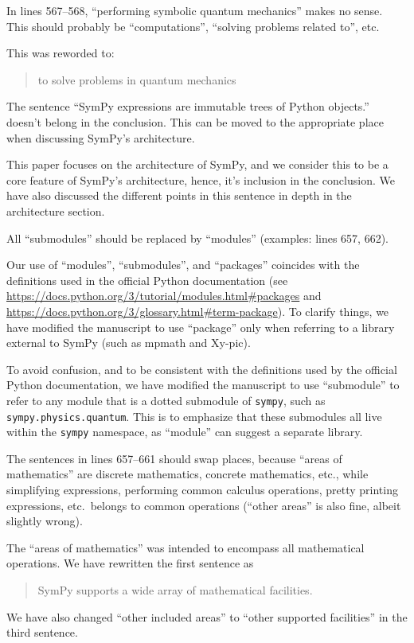 \documentclass[answers,12pt]{exam}
\begin{document}
\begin{questions}
\question In lines 567--568, ``performing symbolic quantum mechanics'' makes no sense. This should probably be ``computations'', ``solving problems related to'', etc.
\begin{solution}
This was reworded to:
\begin{quote}
to solve problems in quantum mechanics
\end{quote}
\end{solution}

\question The sentence ``SymPy expressions are immutable trees of Python objects.'' doesn't belong in the conclusion. This can be moved to the appropriate place when discussing SymPy's architecture.
\begin{solution}
This paper focuses on the architecture of SymPy, and we consider this to be a
core feature of SymPy's architecture, hence, it's inclusion in the conclusion.
We have also discussed the different points in this sentence in depth in the architecture section.
\end{solution}

\question All ``submodules'' should be replaced by ``modules'' (examples:
lines 657, 662).
\label{rev3point37}
\begin{solution}
  Our use of ``modules'', ``submodules'', and ``packages'' coincides with the
  definitions used in the official Python documentation (see
  \url{https://docs.python.org/3/tutorial/modules.html#packages} and
  \url{https://docs.python.org/3/glossary.html#term-package}). To clarify
  things, we have modified the manuscript to use ``package'' only when
  referring to a library external to SymPy (such as mpmath and Xy-pic).

To avoid confusion, and to be consistent with the definitions used by the
official Python documentation, we have modified the manuscript to use
``submodule'' to refer to any module that is a dotted submodule of
\texttt{sympy}, such as \texttt{sympy.physics.quantum}. This is to emphasize
that these submodules all live within the \texttt{sympy} namespace, as ``module''
can suggest a separate library.
\end{solution}

\question The sentences in lines 657--661 should swap places, because ``areas of mathematics'' are discrete mathematics, concrete mathematics, etc., while simplifying expressions, performing common calculus operations, pretty printing expressions, etc.\ belongs to common operations (``other areas'' is also fine, albeit slightly wrong).
\begin{solution}
The ``areas of mathematics'' was intended to encompass all mathematical
operations. We have rewritten the first sentence as
\begin{quote}
SymPy supports a wide array of mathematical facilities.
\end{quote}
We have also changed ``other included areas'' to ``other supported facilities'' in the third sentence.


\end{solution}
\end{questions}
\end{document}
